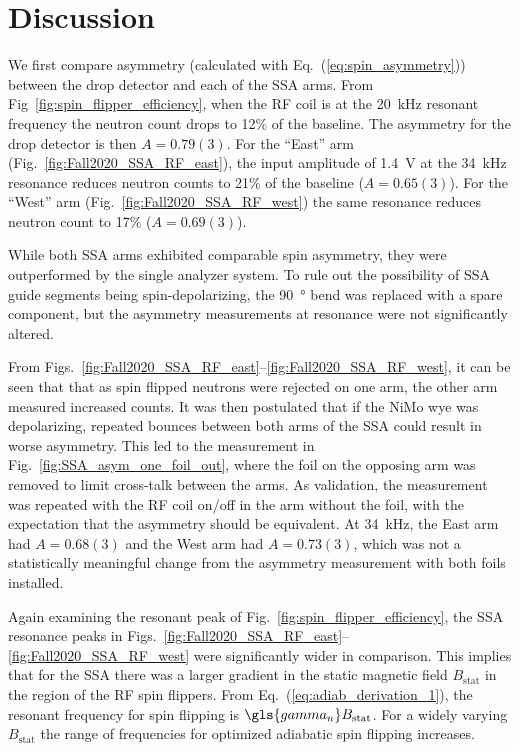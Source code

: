 
\section{Discussion}


We first compare asymmetry (calculated with Eq.~(\ref{eq:spin_asymmetry})) between the drop detector and each of the SSA arms. From Fig~\ref{fig:spin_flipper_efficiency}, when the RF coil is at the \qty{20}{kHz} resonant frequency the neutron count drops to 12\% of the baseline. The asymmetry for the drop detector is then $A= 0.79(3)$. For the ``East'' arm (Fig.~\ref{fig:Fall2020_SSA_RF_east}), the input amplitude of \qty{1.4}{V} at the \qty{34}{kHz} resonance reduces neutron counts to 21\% of the baseline ($A=0.65(3)$). For the ``West'' arm (Fig.~\ref{fig:Fall2020_SSA_RF_west}) the same resonance reduces neutron count to 17\% ($A=0.69(3)$). 

While both SSA arms exhibited comparable spin asymmetry, they were outperformed by the single analyzer system. To rule out the possibility of SSA guide segments being spin-depolarizing, the \qty{90}{\degree} bend was replaced with a spare component, but the asymmetry measurements at resonance were not significantly altered.

From Figs.~\ref{fig:Fall2020_SSA_RF_east}--\ref{fig:Fall2020_SSA_RF_west}, it can be seen that that as spin flipped neutrons were rejected on one arm, the other arm measured increased counts. It was then postulated that if the NiMo wye was depolarizing, repeated \ucn bounces between both arms of the SSA could result in worse asymmetry. This led to the measurement in Fig.~\ref{fig:SSA_asym_one_foil_out}, where the foil on the opposing arm was removed to limit cross-talk between the arms. As validation, the measurement was repeated with the RF coil on/off in the arm without the foil, with the expectation that the asymmetry should be equivalent. At \qty{34}{kHz}, the East arm had $A=0.68(3)$ and the West arm had $A=0.73(3)$, which was not a statistically meaningful change from the asymmetry measurement with both foils installed.

Again examining the resonant peak of Fig.~\ref{fig:spin_flipper_efficiency}, the SSA resonance peaks in Figs.~\ref{fig:Fall2020_SSA_RF_east}--\ref{fig:Fall2020_SSA_RF_west} were significantly wider in comparison. This implies that for the SSA there was a larger gradient in the static magnetic field $B_\text{stat}$ in the region of the RF spin flippers. From Eq.~(\ref{eq:adiab_derivation_1}), the resonant frequency for spin flipping is $\gls{gamma_n} B_\text{stat}$. For a widely varying $B_\text{stat}$ the range of frequencies for optimized adiabatic spin flipping increases.

